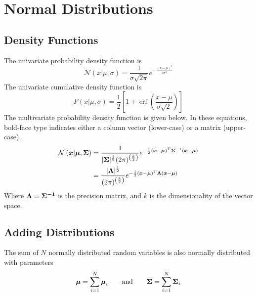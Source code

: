 \documentclass[../../main.tex]{subfiles}
\begin{document}
\chapter{Normal Distributions}

\section{Density Functions}
The univariate probability density function is
\begin{equation}
    \label{eq:uninormaldens}
    \mathcal{N}\left(x| \mu, \sigma \right) =
    \frac{1}{\sigma\sqrt{2\pi}}e^{-\frac{(x - \mu)^2}{2\sigma^2}}
\end{equation}
The univariate cumulative density function is
\begin{equation}
    \label{eq:uninormalcum}
    F\left(x| \mu, \sigma \right) =
    \frac{1}{2}\left[ 1 + \operatorname{erf}\left(\frac{x - \mu}{\sigma \sqrt{2}}  \right) \right]
\end{equation}
The multivariate probability density function is given below.  In these
equations, bold-face type indicates either a column vector (lower-case) or a
matrix (upper-case).
\begin{align}
    \label{eq:multinormaldens}
    \mathcal{N}\left(\boldsymbol{x}| \boldsymbol{\mu}, \boldsymbol{\Sigma} \right)
    &= \frac{1}{
            |\boldsymbol{\Sigma}|^\frac{1}{2} (2\pi)^{\left(\frac{k}{2}\right)}
        }
        e^{
            -\frac{1}{2}
            (\boldsymbol{x} - \boldsymbol{\mu})^T
            \boldsymbol{\Sigma}^{-1}
            (\boldsymbol{x} - \boldsymbol{\mu})
    }\\
    &= \frac{|\boldsymbol{\Lambda}|^\frac{1}{2}}{
             (2\pi)^{\left(\frac{k}{2}\right)}
        }
        e^{
            -\frac{1}{2}
            (\boldsymbol{x} - \boldsymbol{\mu})^T
            \boldsymbol{\Lambda}
            (\boldsymbol{x} - \boldsymbol{\mu})
    }\nonumber
\end{align}
Where $\boldsymbol{\Lambda} = \boldsymbol{\Sigma^{-1}}$ is the precision
matrix, and $k$ is the dimensionality of the vector space.


\section{Adding Distributions}
The sum of $N$ normally distributed random variables is also normally
distributed with parameters
\begin{equation}
    \label{eq:sumnormalmuvar}
    \boldsymbol{\mu} = \sum\limits_{i=1}^{N}\boldsymbol{\mu}_i
    \qquad\text{and}\qquad
    \boldsymbol{\Sigma} = \sum\limits_{i=1}^{N}\boldsymbol{\Sigma}_i
\end{equation}
\end{document}
